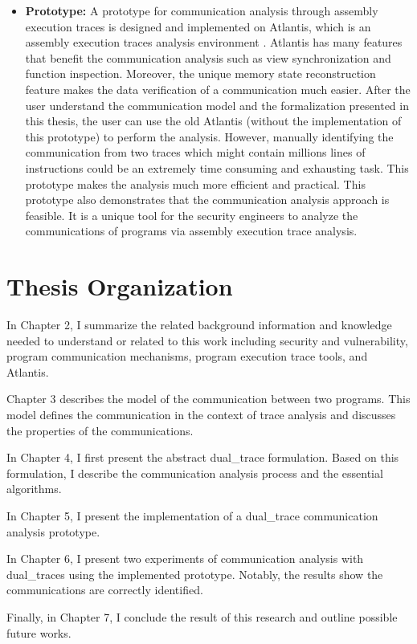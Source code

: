 \begin{itemize}
  \item \textbf{Prototype:} A prototype for communication analysis through assembly execution traces is designed and implemented on Atlantis, which is an assembly execution traces analysis environment \cite{huang2017atlantis}. Atlantis has many features that benefit the communication analysis such as view synchronization and function inspection. Moreover, the unique memory state reconstruction feature makes the data verification of a communication much easier. After the user understand the communication model and the formalization presented in this thesis, the user can use the old Atlantis (without the implementation of this prototype) to perform the analysis. However, manually identifying the communication from two traces which might contain millions lines of instructions could be an extremely time consuming and exhausting task. This prototype makes the analysis much more efficient and practical. This prototype also demonstrates that the communication analysis approach is feasible. It is a unique tool for the security engineers to analyze the communications of programs via assembly execution trace analysis. 
\end{itemize}

\section{Thesis Organization}
In Chapter 2, I summarize the related background information and knowledge needed to understand or related to this work including security and vulnerability, program communication mechanisms, program execution trace tools, and Atlantis. 

Chapter 3 describes the model of the communication between two programs. This model defines the communication in the context of trace analysis and discusses the properties of the communications. 

In Chapter 4, I first present the abstract dual\_trace formulation. Based on this formulation, I describe the communication analysis process and the essential algorithms.

In Chapter 5, I present the implementation of a dual\_trace communication analysis prototype. 

In Chapter 6, I present two experiments of communication analysis with dual\_traces using the implemented prototype. Notably, the results show the communications are correctly identified. 

Finally, in Chapter 7, I conclude the result of this research and outline possible future works.